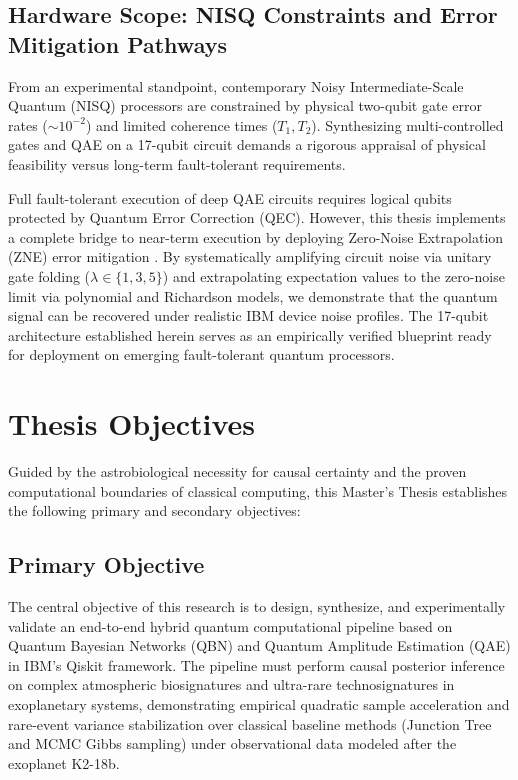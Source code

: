 \subsection{Hardware Scope: NISQ Constraints and Error Mitigation Pathways}
From an experimental standpoint, contemporary Noisy Intermediate-Scale Quantum (NISQ) processors \cite{preskill2018} are constrained by physical two-qubit gate error rates ($\sim 10^{-2}$) and limited coherence times ($T_1, T_2$). Synthesizing multi-controlled gates and QAE on a 17-qubit circuit demands a rigorous appraisal of physical feasibility versus long-term fault-tolerant requirements.

Full fault-tolerant execution of deep QAE circuits requires logical qubits protected by Quantum Error Correction (QEC). However, this thesis implements a complete bridge to near-term execution by deploying Zero-Noise Extrapolation (ZNE) error mitigation \cite{temme2017, endo2018}. By systematically amplifying circuit noise via unitary gate folding ($\lambda \in \{1, 3, 5\}$) and extrapolating expectation values to the zero-noise limit via polynomial and Richardson models, we demonstrate that the quantum signal can be recovered under realistic IBM device noise profiles. The 17-qubit architecture established herein serves as an empirically verified blueprint ready for deployment on emerging fault-tolerant quantum processors.


\section{Thesis Objectives}\label{sec:thesis_objectives}

Guided by the astrobiological necessity for causal certainty and the proven computational boundaries of classical computing, this Master's Thesis establishes the following primary and secondary objectives:

\subsection{Primary Objective}
The central objective of this research is to design, synthesize, and experimentally validate an end-to-end hybrid quantum computational pipeline based on Quantum Bayesian Networks (QBN) and Quantum Amplitude Estimation (QAE) in IBM's Qiskit framework. The pipeline must perform causal posterior inference on complex atmospheric biosignatures and ultra-rare technosignatures in exoplanetary systems, demonstrating empirical quadratic sample acceleration and rare-event variance stabilization over classical baseline methods (Junction Tree and MCMC Gibbs sampling) under observational data modeled after the exoplanet K2-18b.

